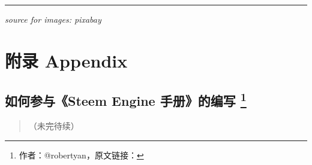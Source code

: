 \documentclass[]{ctexbook}
\begin{document}
\begin{center}\rule{0.5\linewidth}{\linethickness}\end{center}

\emph{source for images: pixabay}

\appendix

\hypertarget{appendix}{%
\chapter{附录 Appendix}\label{appendix}}

\hypertarget{how-to-get-involved}{%
\section[如何参与《Steem Engine 手册》的编写 ]{\texorpdfstring{如何参与《Steem Engine 手册》的编写 \footnote{作者：@robertyan，原文链接：}}{如何参与《Steem Engine 手册》的编写 }}\label{how-to-get-involved}}

\begin{quote}
（未完待续）
\end{quote}

\printindex

\newpage \thispagestyle{empty}


% 
\end{document}
